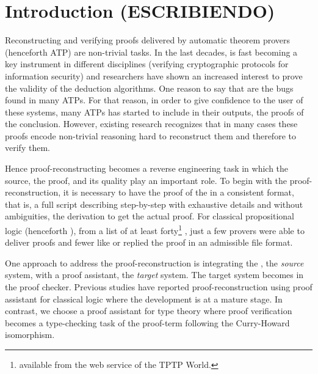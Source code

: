 \documentclass[../main.tex]{subfiles}
\begin{document}

\section{Introduction (ESCRIBIENDO)}
\label{sec:introduction}

Reconstructing and verifying proofs delivered by automatic theorem provers
(henceforth ATP) are non-trivial tasks.
In the last decades, \ATPs is fast becoming a key instrument in 
different disciplines (\eg verifying cryptographic protocols for information security) and researchers have shown an increased interest to prove the validity of the deduction algorithms.
One reason to say that are the bugs found in many ATPs.
For that reason, in order to give confidence to the user of these systems,
many ATPs has started to include in their outputs, the proofs of the
conclusion. However, existing research recognizes that in many cases these proofs encode non-trivial reasoning
hard to reconstruct them and therefore to verify them.

Hence proof-reconstructing becomes a reverse engineering task
in which the source, the proof, and its quality play an important role.
To begin with the proof-reconstruction, it is necessary to have
the proof of the \ATP in a consistent format, that is, a full script 
describing step-by-step with exhaustive details and without ambiguities, the 
derivation to get the actual proof.  
For classical propositional logic (henceforth \CPL), from a list of at least forty\footnote{\ATPs 
available from the web
service  of the TPTP World.} \ATPs, just a few
provers were able to deliver proofs and fewer like  or \Metis 
replied the proof in an admissible file format.

One approach to address the proof-reconstruction 
is integrating the \ATP, the \emph{source} system, with a proof assistant, the \emph{target} system.
The target system becomes in the proof checker.   
Previous studies have reported proof-reconstruction using proof assistant for classical logic where the development is at a mature stage.
In contrast, we choose a proof assistant for type theory
where proof verification becomes a type-checking task of the
proof-term following the Curry-Howard isomorphism.



\end{document}
